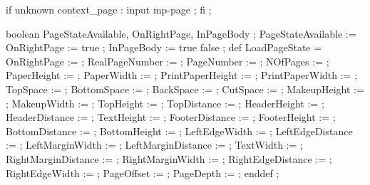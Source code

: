 


\unprotect

\appendtoks
  if unknown context_page : input mp-page ; fi ;
\to \MPinitializations


  boolean PageStateAvailable, OnRightPage, InPageBody ; 
  PageStateAvailable := OnRightPage := true ;
  InPageBody         := \ifinpagebody true \else false \fi ; 
  def LoadPageState =
    OnRightPage         :=      \MPonrightpage ;
    RealPageNumber      :=  \the\realpageno ;
    PageNumber          :=  \the\pageno ;
    NOfPages            :=      \lastpage ;
    PaperHeight         :=  \the\papierhoogte ;
    PaperWidth          :=  \the\papierbreedte ;
    PrintPaperHeight    :=  \the\printpapierhoogte ;
    PrintPaperWidth     :=  \the\printpapierbreedte ;
    TopSpace            :=  \the\kopwit ;
    BottomSpace         :=  \the\bodemwit ;
    BackSpace           :=  \the\rugwit ;
    CutSpace            :=  \the\snijwit ;
    MakeupHeight        :=  \the\zethoogte ;
    MakeupWidth         :=  \the\zetbreedte ;
    TopHeight           :=  \the\bovenhoogte ;
    TopDistance         := \@the\bovenafstand ;
    HeaderHeight        :=  \the\hoofdhoogte ;
    HeaderDistance      := \@the\hoofdafstand ;
    TextHeight          :=  \the\teksthoogte ;
    FooterDistance      := \@the\voetafstand ;
    FooterHeight        :=  \the\voethoogte ;
    BottomDistance      := \@the\onderafstand ;
    BottomHeight        :=  \the\onderhoogte ;
    LeftEdgeWidth       :=  \the\linkerrandbreedte ;
    LeftEdgeDistance    := \@the\linkerrandafstand ;
    LeftMarginWidth     :=  \the\linkermargebreedte ;
    LeftMarginDistance  := \@the\linkermargeafstand ;
    TextWidth           :=  \the\tekstbreedte ;
    RightMarginDistance := \@the\rechtermargeafstand ;
    RightMarginWidth    :=  \the\rechtermargebreedte ;
    RightEdgeDistance   := \@the\rechterrandafstand ;
    RightEdgeWidth      :=  \the\rechterrandbreedte ;
    PageOffset          :=  \the\pageoffset ;
    PageDepth           :=  \the\pagedepth ;
  enddef ;
\stopuseMPgraphic


